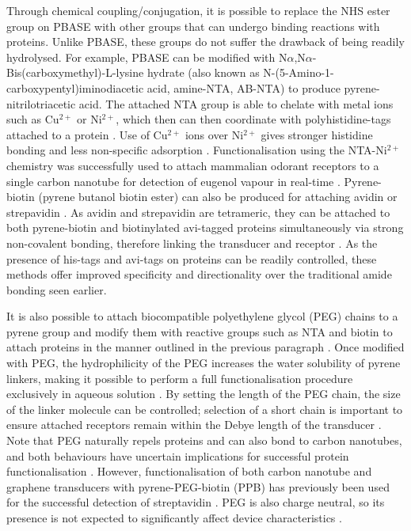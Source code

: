 \documentclass[
  a4paper,
]{scrbook}
\begin{document}
Through chemical coupling/conjugation, it is possible to replace the NHS
ester group on PBASE with other groups that can undergo binding
reactions with proteins. Unlike PBASE, these groups do not suffer the
drawback of being readily hydrolysed. For example, PBASE can be modified
with N\(\alpha\),N\(\alpha\)-Bis(carboxymethyl)-L-lysine hydrate (also
known as N-(5-Amino-1-carboxypentyl)iminodiacetic acid, amine-NTA,
AB-NTA) to produce pyrene-nitrilotriacetic acid. The attached NTA group
is able to chelate with metal ions such as Cu\(^{2+}\) or Ni\(^{2+}\),
which then can then coordinate with polyhistidine-tags attached to a
protein \autocite{Holzinger2011,Fruh2011,Amano2016,Chang2017}. Use of
Cu\(^{2+}\) ions over Ni\(^{2+}\) gives stronger histidine bonding and
less non-specific adsorption \autocite{Chang2017}. Functionalisation
using the NTA-Ni\(^{2+}\) chemistry was successfully used to attach
mammalian odorant receptors to a single carbon nanotube for detection of
eugenol vapour in real-time \autocite{Goldsmith2011}. Pyrene-biotin
(pyrene butanol biotin ester) can also be produced for attaching avidin
or strepavidin \autocite{Holzinger2011}. As avidin and strepavidin are
tetrameric, they can be attached to both pyrene-biotin and biotinylated
avi-tagged proteins simultaneously via strong non-covalent bonding,
therefore linking the transducer and receptor
\autocite{Star2003a,Dundas2013,Hermanson2013-11,Fairhead2015}. As the
presence of his-tags and avi-tags on proteins can be readily controlled,
these methods offer improved specificity and directionality over the
traditional amide bonding seen earlier.

It is also possible to attach biocompatible \autocite{Chen2004}
polyethylene glycol (PEG) chains to a pyrene group and modify them with
reactive groups such as NTA and biotin to attach proteins in the manner
outlined in the previous paragraph
\autocite{Hermanson2013-18,Meran2018}. Once modified with PEG, the
hydrophilicity of the PEG increases the water solubility of pyrene
linkers, making it possible to perform a full functionalisation
procedure exclusively in aqueous solution
\autocite{Chen2004,Hermanson2013-18}. By setting the length of the PEG
chain, the size of the linker molecule can be controlled; selection of a
short chain is important to ensure attached receptors remain within the
Debye length of the transducer \autocite{Shkodra2021}. Note that PEG
naturally repels proteins and can also bond to carbon nanotubes, and
both behaviours have uncertain implications for successful protein
functionalisation \autocite{Chen2004}. However, functionalisation of
both carbon nanotube and graphene transducers with pyrene-PEG-biotin
(PPB) has previously been used for the successful detection of
streptavidin \autocite{Star2003a,Miki2019}. PEG is also charge neutral,
so its presence is not expected to significantly affect device
characteristics \autocite{Chen2004}.
\end{document}
